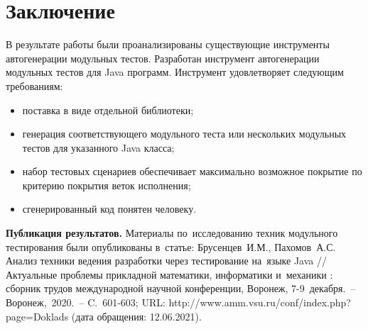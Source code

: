 \chapter*{Заключение}                       %

\hspace*{2.5em}В результате работы были проанализированы существующие инструменты автогенерации модульных тестов. Разработан инструмент автогенерации модульных тестов для Java программ. Инструмент удовлетворяет следующим требованиям:

\begin{itemize}
	\item поставка в виде отдельной библиотеки;
	\item генерация соответствующего модульного теста или нескольких модульных тестов для указанного Java класса;
	\item набор тестовых сценариев обеспечивает максимально возможное покрытие по критерию покрытия веток исполнения;
	\item сгенерированный код понятен человеку.
\end{itemize}


\textbf{Публикация результатов.} Материалы по~исследованию техник модульного тестирования были опубликованы в~статье:  Брусенцев~И.М., Пахомов~А.С.  Анализ техники ведения разработки через тестирование на~языке Java // Актуальные проблемы прикладной математики, информатики и~механики : сборник трудов международной научной конференции, Воронеж, 7-9~декабря.~-- Воронеж,~2020.~-- C.~601-603; URL: http://www.amm.vsu.ru/conf/index.php?page=Doklads (дата обращения: 12.06.2021).
